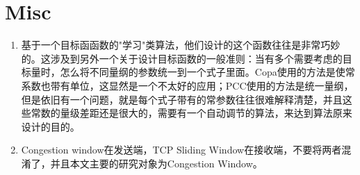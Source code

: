 \documentclass[a4paper, 12pt, UTF8]{ctexart}
\begin{document}
\clearpage

\section{Misc}

\begin{enumerate}
	\item 基于一个目标函函数的"学习"类算法，他们设计的这个函数往往是非常巧妙的。这涉及到另外一个关于设计目标函数的一般准则：当有多个需要考虑的目标量时，怎么将不同量纲的参数统一到一个式子里面。Copa使用的方法是使常系数也带有单位，这显然是一个不太好的应用；PCC使用的方法是统一量纲，但是依旧有一个问题，就是每个式子带有的常参数往往很难解释清楚，并且这些常数的量级差距还是很大的，需要有一个自动调节的算法，来达到算法原来设计的目的。
	\item Congestion window在发送端，TCP Sliding Window在接收端，不要将两者混淆了，并且本文主要的研究对象为Congestion Window。
\end{enumerate}

\clearpage


\end{document}
